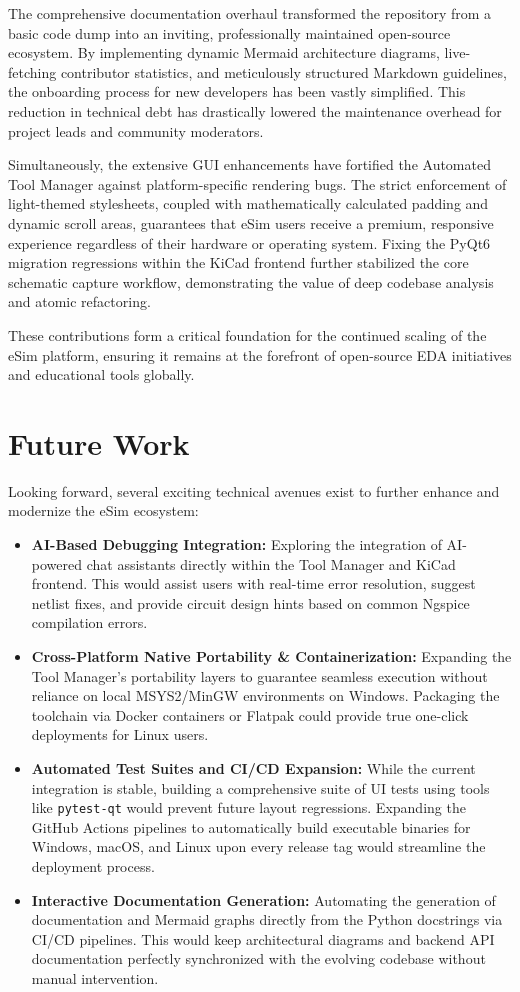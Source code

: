 \documentclass[12pt,a4paper]{report}
\begin{document}
The comprehensive documentation overhaul transformed the repository from a basic code dump into an inviting, professionally maintained open-source ecosystem. By implementing dynamic Mermaid architecture diagrams, live-fetching contributor statistics, and meticulously structured Markdown guidelines, the onboarding process for new developers has been vastly simplified. This reduction in technical debt has drastically lowered the maintenance overhead for project leads and community moderators.

Simultaneously, the extensive GUI enhancements have fortified the Automated Tool Manager against platform-specific rendering bugs. The strict enforcement of light-themed stylesheets, coupled with mathematically calculated padding and dynamic scroll areas, guarantees that eSim users receive a premium, responsive experience regardless of their hardware or operating system. Fixing the PyQt6 migration regressions within the KiCad frontend further stabilized the core schematic capture workflow, demonstrating the value of deep codebase analysis and atomic refactoring.

These contributions form a critical foundation for the continued scaling of the eSim platform, ensuring it remains at the forefront of open-source EDA initiatives and educational tools globally.

\section{Future Work}
Looking forward, several exciting technical avenues exist to further enhance and modernize the eSim ecosystem:
\begin{itemize}
    \item \textbf{AI-Based Debugging Integration:} Exploring the integration of AI-powered chat assistants directly within the Tool Manager and KiCad frontend. This would assist users with real-time error resolution, suggest netlist fixes, and provide circuit design hints based on common Ngspice compilation errors.
    \item \textbf{Cross-Platform Native Portability \& Containerization:} Expanding the Tool Manager's portability layers to guarantee seamless execution without reliance on local MSYS2/MinGW environments on Windows. Packaging the toolchain via Docker containers or Flatpak could provide true one-click deployments for Linux users.
    \item \textbf{Automated Test Suites and CI/CD Expansion:} While the current integration is stable, building a comprehensive suite of UI tests using tools like \texttt{pytest-qt} would prevent future layout regressions. Expanding the GitHub Actions pipelines to automatically build executable binaries for Windows, macOS, and Linux upon every release tag would streamline the deployment process.
    \item \textbf{Interactive Documentation Generation:} Automating the generation of documentation and Mermaid graphs directly from the Python docstrings via CI/CD pipelines. This would keep architectural diagrams and backend API documentation perfectly synchronized with the evolving codebase without manual intervention.
\end{itemize}
\end{document}
